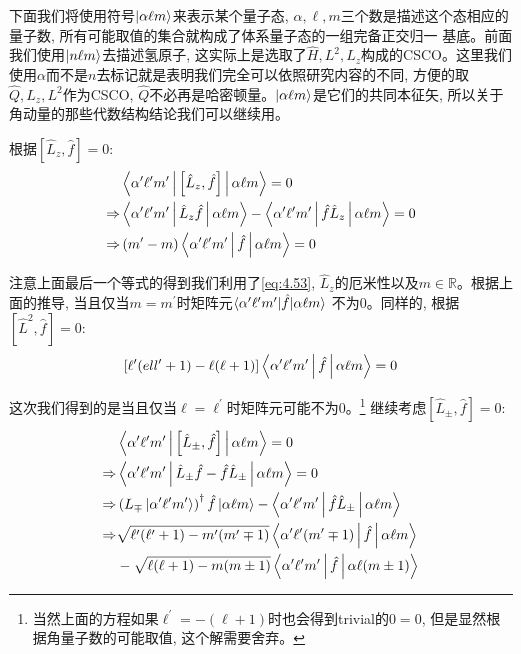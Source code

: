 \documentclass[a4paper,zihao=-4,linespread=1]{ctexrep}
\begin{document}
    下面我们将使用符号$\ket{\alpha\ell m}$来表示某个量子态, $\alpha,\ell,m$三个数是描述这个态相应的量子数, 所有可能取值的集合就构成了体系量子态的一组完备正交归一
    基底。前面我们使用$\ket{n\ell m}$去描述氢原子, 这实际上是选取了$\hat{H},L^2,L_z$构成的CSCO。这里我们使用$\alpha $而不是$n$去标记就是表明我们完全可以依照研究内容的不同, 方便的取
    $\hat{Q},L_z,L^2$作为CSCO, $\hat{Q}$不必再是哈密顿量。$\ket{\alpha\ell m}$是它们的共同本征矢, 所以关于角动量的那些代数结构结论我们可以继续用。
    
    根据$\left[\hat{L}_z,\hat{f}\right]=0$:
    \begin{align*}
        &\Braket{\alpha^\prime   \ell^\prime   m^\prime  |\left[\hat{L}_z,\hat{f}\right]|\alpha \ell m}=0\\
        \Rightarrow&\Braket{\alpha^\prime   \ell^\prime   m^\prime  |\hat{L}_z\hat{f}|\alpha \ell m}-\Braket{\alpha^\prime   \ell^\prime   m^\prime  |\hat{f}\hat{L}_z|\alpha \ell m}=0\\
        \Rightarrow&\left(m^\prime-m\right)\Braket{\alpha^\prime   \ell^\prime   m^\prime  |\hat{f}|\alpha \ell m}=0
    \end{align*}
    
    注意上面最后一个等式的得到我们利用了\ref{eq:4.53}, $\hat L_z$的厄米性以及$m\in \mathbb{R}$。根据上面的推导, 当且仅当$m=m^\prime$时矩阵元$\braket{\alpha^\prime   \ell^\prime   m^\prime  |\hat{f}|\alpha \ell m}$
    不为0。同样的, 根据$\left[\hat{L}^2,\hat{f}\right]=0$:
    \begin{equation}
        \left[\ell^\prime(ell^\prime +1)-\ell(\ell+1)\right]\Braket{\alpha^\prime   \ell^\prime   m^\prime  |\hat{f}|\alpha \ell m}=0
    \end{equation}

    这次我们得到的是当且仅当$\ell=\ell^\prime$时矩阵元可能不为0。\footnote{当然上面的方程如果$\ell^\prime=-(\ell+1)$时也会得到trivial的$0=0$, 但是显然根据角量子数的可能取值, 这个解需要舍弃。}
    继续考虑$\left[\hat{L}_\pm,\hat{f}\right]=0$:
    \begin{align*}
        &\Braket{\alpha^\prime   \ell^\prime   m^\prime  |\left[\hat{L}_\pm,\hat{f}\right]|\alpha \ell m}=0\\
        \Rightarrow&\Braket{\alpha^\prime   \ell^\prime   m^\prime  |\hat{L}_\pm\hat{f}-\hat{f}\hat{L}_\pm|\alpha \ell m}=0\\
        \Rightarrow&\left(L_\mp\ket{\alpha^\prime   \ell^\prime   m^\prime  }\right)^\dagger\hat{f}\ket{\alpha\ell m}-\Braket{\alpha^\prime   \ell^\prime   m^\prime  |\hat{f}\hat{L}_\pm|\alpha\ell m}\\
        \Rightarrow&\sqrt{\ell^\prime(\ell^\prime+1)-m^\prime(m^\prime\mp 1)}\Braket{\alpha^\prime   \ell^\prime   (m^\prime\mp 1)  |\hat{f}|\alpha \ell m}\\
        &-\sqrt{\ell(\ell+1)-m(m\pm 1)}\Braket{\alpha^\prime   \ell^\prime   m^\prime  |\hat{f}|\alpha \ell (m\pm 1)}
    \end{align*}
    
\end{document}
